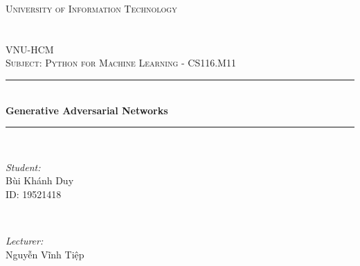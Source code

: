 \documentclass[14pt]{article}
\begin{document}
\begin{titlepage}

\newcommand{\HRule}{\rule{\linewidth}{0.5mm}} %

\center %
 

\textsc{\LARGE University of Information Technology \\ \\ \\ VNU-HCM }\\[0.5 cm] %

\textsc{\large Subject: Python for Machine Learning - CS116.M11  }\\[0.5cm] %


\HRule \\[0.4cm]
{ \huge \bfseries Generative Adversarial Networks
}\\[0.4cm] %
\HRule \\[0.4cm]
 

\begin{minipage}{0.4\textwidth}
\begin{flushleft} \large
\emph{Student: }\\
\textbullet \quad Bùi Khánh Duy\\
ID: 19521418 %
\end{flushleft}
\end{minipage}
~
\begin{minipage}{0.4\textwidth}
\begin{flushright} \large
\emph{Lecturer:} \\
Nguyễn Vĩnh Tiệp %
\end{flushright}
\end{minipage}\\[2cm]


\end{titlepage}
\end{document}
